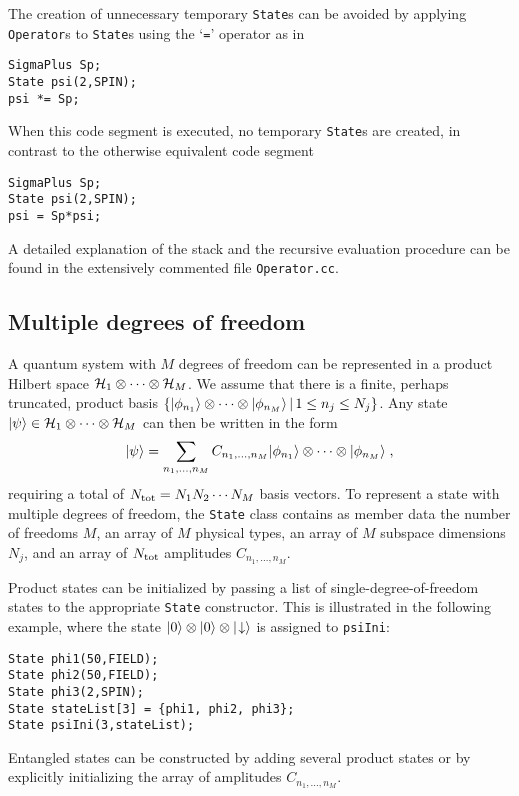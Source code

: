The creation of unnecessary temporary {\tt State}s can be avoided by applying
{\tt Operator}s to {\tt State}s using the `{\tt *=}' operator as in
\begin{verbatim}
SigmaPlus Sp;
State psi(2,SPIN);
psi *= Sp;
\end{verbatim}
When this code segment is executed, no temporary {\tt State}s are created,
in contrast to the otherwise equivalent code segment
\begin{verbatim}
SigmaPlus Sp;  
State psi(2,SPIN);
psi = Sp*psi;
\end{verbatim}

A detailed explanation of the stack and the recursive evaluation procedure
can be found in the extensively commented file {\tt Operator.cc}.


\subsection{Multiple degrees of freedom}

A quantum system with $M$ degrees of freedom can be represented in a product
Hilbert space ${\cal H}_1 \otimes \cdots \otimes {\cal H}_M$. We assume that
there is a finite, perhaps truncated, product basis
$\{| \phi_{n_1} \rangle\otimes\cdots\otimes| \phi_{n_M} \rangle\,|\,1\le n_j\le N_j\}$.
Any state $| \psi \rangle\in{\cal H}_1 \otimes \cdots \otimes {\cal H}_M$ can then be
written in the form
\begin{equation}
  | \psi \rangle = \sum_{n_1, \ldots, n_M} C_{n_1, \ldots, n_M}
  | \phi_{n_1} \rangle\otimes\cdots\otimes| \phi_{n_M} \rangle \;,
\end{equation}
requiring a total of $N_{\rm tot} = N_1 N_2 \cdots N_M$ basis vectors.  To
represent a state with multiple degrees of freedom, the {\tt State} class
contains as member data the number of freedoms $M$, an array of $M$ physical
types, an array of $M$ subspace dimensions $N_j$, and an array of $N_{\rm tot}$
amplitudes $C_{n_1,\ldots,n_M}$.

Product states can be initialized by passing a list of single-degree-of-freedom
states to the appropriate {\tt State} constructor. This is illustrated in the
following example, where the state
$| 0 \rangle\otimes| 0 \rangle\otimes|\!\downarrow\rangle$ is assigned to {\tt psiIni}:
\begin{verbatim}
State phi1(50,FIELD);
State phi2(50,FIELD);
State phi3(2,SPIN);
State stateList[3] = {phi1, phi2, phi3};
State psiIni(3,stateList);
\end{verbatim}
Entangled states can be constructed by adding several product states or by
explicitly initializing the array of amplitudes $C_{n_1,\ldots,n_M}$.

